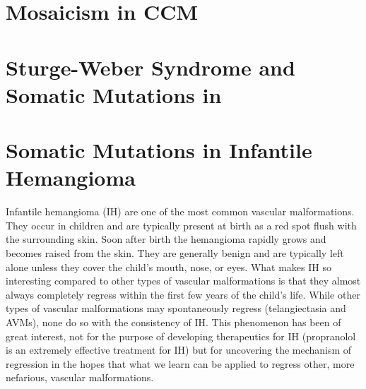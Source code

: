 \section{Mosaicism in CCM}



\section{Sturge-Weber Syndrome and Somatic Mutations in }








\section{Somatic Mutations in Infantile Hemangioma}
Infantile hemangioma (IH) are one of the most common vascular malformations. They occur in children and are typically present at birth as a red spot flush with the surrounding skin. Soon after birth the hemangioma rapidly grows and becomes raised from the skin. They are generally benign and are typically left alone unless they cover the child's mouth, nose, or eyes. What makes IH so interesting compared to other types of vascular malformations is that they almost always completely regress within the first few years of the child's life. While other types of vascular malformations may spontaneously regress (telangiectasia and AVMs), none do so with the consistency of IH. This phenomenon has been of great interest, not for the purpose of developing therapeutics for IH (propranolol is an extremely effective treatment for IH) but for uncovering the mechanism of regression in the hopes that what we learn can be applied to regress other, more nefarious, vascular malformations. 

